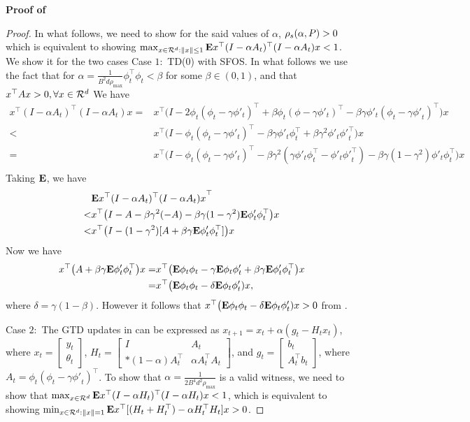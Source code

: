 \textbf{Proof of }
\begin{proof}
In what follows, we need to show for the said values of $\alpha$, $\rho_s(\alpha,P)>0$ which is equivalent to showing $\max_{x\in \mathcal{R}^d: \left\| x\right\|\leq 1}\mathbf{E}{x^\top(I-\alpha A_t)^\top (I-\alpha A_t)x}<1$. We show it for the two cases
Case $1:$  TD(0) with SFOS. In what follows we use the fact that for $\alpha=\frac{1}{B^2d \rho_{\max}}\phi^\top_t\phi_t<\beta$ for some $\beta\in (0,1)$, and that $x^\top Ax>0,\forall x \in \mathcal{R}^{d}$ We have
\begin{align*}
x^\top(I-\alpha A_t)^\top (I-\alpha A_t)x=&x^\top\big( I- 2\phi_t(\phi_t-\gamma\phi'_t)^\top +\beta\phi_t(\phi-\gamma\phi'_t)^\top-\beta\gamma\phi'_t(\phi_t-\gamma{\phi'}_t)^\top \big)x\\
<&x^\top\big( I- \phi_t(\phi_t-\gamma\phi'_t)^\top -\beta\gamma\phi'_t\phi^\top_t+\beta\gamma^2\phi'_t{\phi'}_t^\top \big)x\\
=&x^\top\big( I- \phi_t(\phi_t-\gamma\phi'_t)^\top -\beta\gamma^2(\gamma\phi'_t\phi^\top_t- \phi'_t{\phi'}_t^\top)-\beta\gamma(1-\gamma^2)\phi'_t\phi_t^\top \big)x\\
\end{align*}
Taking $\mathbf{E}$, we have
\begin{align*}
&\mathbf{E}{x^\top(I-\alpha A_t)^\top (I-\alpha A_t)x}^\top\\
 <&x^\top\big( I- A -\beta\gamma^2(-A)-\beta\gamma(1-\gamma^2)\mathbf{E}{\phi'_t\phi_t^\top} \big)x\\
<&x^\top\big( I- (1-\gamma^2)[A +\beta\gamma\mathbf{E}{\phi'_t\phi_t^\top}] \big)x
\end{align*}
Now we have 
\begin{align*}
x^\top\big(A +\beta\gamma\mathbf{E}{\phi'_t\phi_t^\top}\big)x=& x^\top\big(\mathbf{E}{\phi_t\phi_t}-\gamma\mathbf{E}{\phi_t\phi'_t} +\beta\gamma\mathbf{E}{\phi'_t\phi_t^\top}\big)x\\
=&x^\top\big(\mathbf{E}{\phi_t\phi_t}-\delta\mathbf{E}{\phi_t\phi'_t} )x,
\end{align*}
where $\delta=\gamma(1-\beta)$. However it follows that $x^\top\big(\mathbf{E}{\phi_t\phi_t}-\delta\mathbf{E}{\phi_t\phi'_t} )x>0$ from .

Case $2:$ The GTD updates in  can be expressed as $x_{t+1}=x_t+\alpha (g_t -H_t x_t)$, where $x_t=\left[\begin{matrix}y_t\\\theta_t\end{matrix}\right]$, $H_t=\left[\begin{matrix}I &A_t \\*(1-\alpha)A^\top_t & \alpha A_t^\top A_t\end{matrix}\right]$, and $g_t=\left[\begin{matrix} b_t\\ A_t^\top b_t\end{matrix}\right]$, where $A_t=\phi_t(\phi_t-\gamma{\phi'}_t)^\top$. To show that $\alpha=\frac{1}{2B^4 d^2 \rho_{\max}}$ is a valid witness, we need to show that  $\max_{x\in \mathcal{R}^d}\mathbf{E}{x^\top(I-\alpha H_t)^\top (I-\alpha H_t)x}<1$, which is equivalent to showing $\min_{x\in \mathcal{R}^d:\left\| x\right\|=1}\mathbf{E}{x^\top[(H_t+H_t^\top) -\alpha H_t^\top H_t]x}>0$.


\end{proof}
